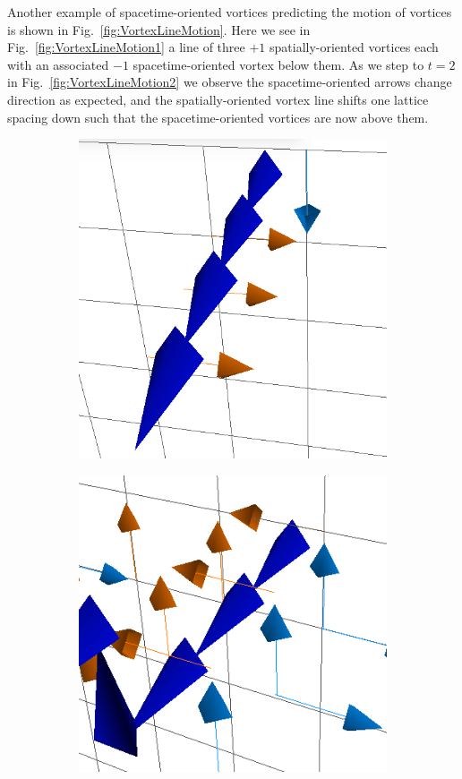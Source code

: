 Another example of spacetime-oriented vortices predicting the motion of vortices is shown in Fig.~\ref{fig:VortexLineMotion}. Here we see in Fig.~\ref{fig:VortexLineMotion1} a line of three $+1$ spatially-oriented vortices each with an associated $-1$ spacetime-oriented vortex below them. As we step to $t=2$ in Fig.~\ref{fig:VortexLineMotion2} we observe the spacetime-oriented arrows change direction as expected, and the spatially-oriented vortex line shifts one lattice spacing down such that the spacetime-oriented vortices are now above them.\\
%
\begin{figure}[H]
\centering
\begin{subfigure}[b]{0.45\textwidth}
\centering
\includegraphics[height=0.2\textheight]{./plaqlinet1_SW8_line.png}
\end{subfigure}
\hspace{-0.5cm}
\begin{subfigure}[b]{0.45\textwidth}
\centering
\includegraphics[height=0.2\textheight]{./plaqlinet2_SW8_line.png}

\end{subfigure}
\end{figure}
